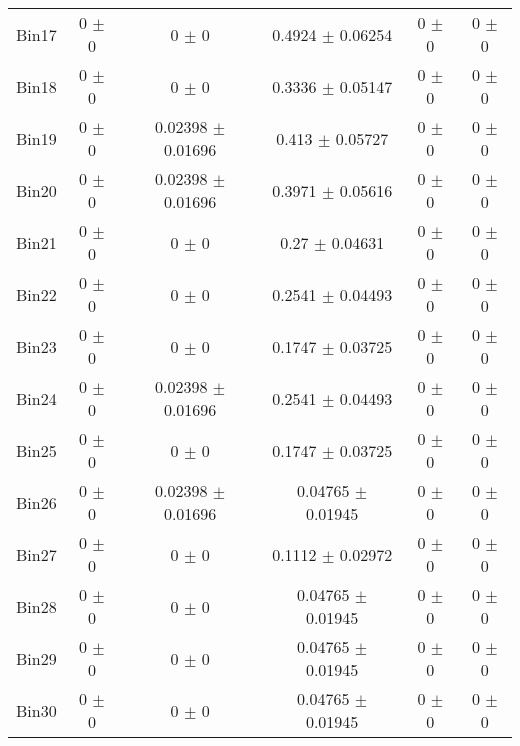 \begin{tabular}{@{\extracolsep{4pt}}lccccc@{}}
     Bin17 & 0 $\pm$ 0 & 0 $\pm$ 0 & 0.4924 $\pm$ 0.06254 & 0 $\pm$ 0 & 0 $\pm$ 0 \\ 
     Bin18 & 0 $\pm$ 0 & 0 $\pm$ 0 & 0.3336 $\pm$ 0.05147 & 0 $\pm$ 0 & 0 $\pm$ 0 \\ 
     Bin19 & 0 $\pm$ 0 & 0.02398 $\pm$ 0.01696 & 0.413 $\pm$ 0.05727 & 0 $\pm$ 0 & 0 $\pm$ 0 \\ 
     Bin20 & 0 $\pm$ 0 & 0.02398 $\pm$ 0.01696 & 0.3971 $\pm$ 0.05616 & 0 $\pm$ 0 & 0 $\pm$ 0 \\ 
     Bin21 & 0 $\pm$ 0 & 0 $\pm$ 0 & 0.27 $\pm$ 0.04631 & 0 $\pm$ 0 & 0 $\pm$ 0 \\ 
     Bin22 & 0 $\pm$ 0 & 0 $\pm$ 0 & 0.2541 $\pm$ 0.04493 & 0 $\pm$ 0 & 0 $\pm$ 0 \\ 
     Bin23 & 0 $\pm$ 0 & 0 $\pm$ 0 & 0.1747 $\pm$ 0.03725 & 0 $\pm$ 0 & 0 $\pm$ 0 \\ 
     Bin24 & 0 $\pm$ 0 & 0.02398 $\pm$ 0.01696 & 0.2541 $\pm$ 0.04493 & 0 $\pm$ 0 & 0 $\pm$ 0 \\ 
     Bin25 & 0 $\pm$ 0 & 0 $\pm$ 0 & 0.1747 $\pm$ 0.03725 & 0 $\pm$ 0 & 0 $\pm$ 0 \\ 
     Bin26 & 0 $\pm$ 0 & 0.02398 $\pm$ 0.01696 & 0.04765 $\pm$ 0.01945 & 0 $\pm$ 0 & 0 $\pm$ 0 \\ 
     Bin27 & 0 $\pm$ 0 & 0 $\pm$ 0 & 0.1112 $\pm$ 0.02972 & 0 $\pm$ 0 & 0 $\pm$ 0 \\ 
     Bin28 & 0 $\pm$ 0 & 0 $\pm$ 0 & 0.04765 $\pm$ 0.01945 & 0 $\pm$ 0 & 0 $\pm$ 0 \\ 
     Bin29 & 0 $\pm$ 0 & 0 $\pm$ 0 & 0.04765 $\pm$ 0.01945 & 0 $\pm$ 0 & 0 $\pm$ 0 \\ 
     Bin30 & 0 $\pm$ 0 & 0 $\pm$ 0 & 0.04765 $\pm$ 0.01945 & 0 $\pm$ 0 & 0 $\pm$ 0 \\ 
\hline\hline
  \end{tabular}
